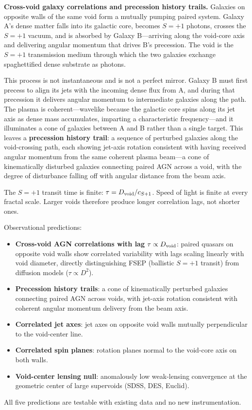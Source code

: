 \documentclass[11pt,letterpaper]{article}
\begin{document}
\textbf{Cross-void galaxy correlations and precession history trails.}
\label{sec:voidcorrelations}
Galaxies on opposite walls of the same void form a mutually pumping paired system.
Galaxy A's dense matter falls into its galactic core, becomes $S{=}+1$ photons,
crosses the $S{=}+1$ vacuum, and is absorbed by Galaxy B---arriving along the
void-core axis and delivering angular momentum that drives B's precession. The void
is the $S{=}+1$ transmission medium through which the two galaxies exchange
spaghettified dense substrate as photons.

This process is not instantaneous and is not a perfect mirror. Galaxy B must first
precess to align its jets with the incoming dense flux from A, and during that
precession it delivers angular momentum to intermediate galaxies along the path.
The plasma is coherent---wavelike because the galactic core spins along its jet axis
as dense mass accumulates, imparting a characteristic frequency---and it illuminates
a cone of galaxies between A and B rather than a single target. This leaves a
\textbf{precession history trail}: a sequence of perturbed galaxies along the
void-crossing path, each showing jet-axis rotation consistent with having received
angular momentum from the same coherent plasma beam---a cone of kinematically
disturbed galaxies connecting paired AGN across a void, with the degree of
disturbance falling off with angular distance from the beam axis.

The $S{=}+1$ transit time is finite: $\tau = D_{\rm void}/c_{S+1}$. Speed of light
is finite at every fractal scale. Larger voids therefore produce longer correlation
lags, not shorter ones.

Observational predictions:
\begin{itemize}
\item \textbf{Cross-void AGN correlations with lag $\tau \propto D_{\rm void}$}:
    paired quasars on opposite void walls show correlated variability with lags
    scaling linearly with void diameter, directly distinguishing FSEP (ballistic
    $S{=}+1$ transit) from diffusion models ($\tau \propto D^2$).
\item \textbf{Precession history trails}: a cone of kinematically perturbed
    galaxies connecting paired AGN across voids, with jet-axis rotation consistent
    with coherent angular momentum delivery from the beam axis.
\item \textbf{Correlated jet axes}: jet axes on opposite void walls mutually
    perpendicular to the void-center line.
\item \textbf{Correlated spin planes}: rotation planes normal to the void-core
    axis on both walls.
\item \textbf{Void-center lensing null}: anomalously low weak-lensing convergence
    at the geometric center of large supervoids (SDSS, DES, Euclid).
\end{itemize}
All five predictions are testable with existing data and no new instrumentation.
\end{document}
